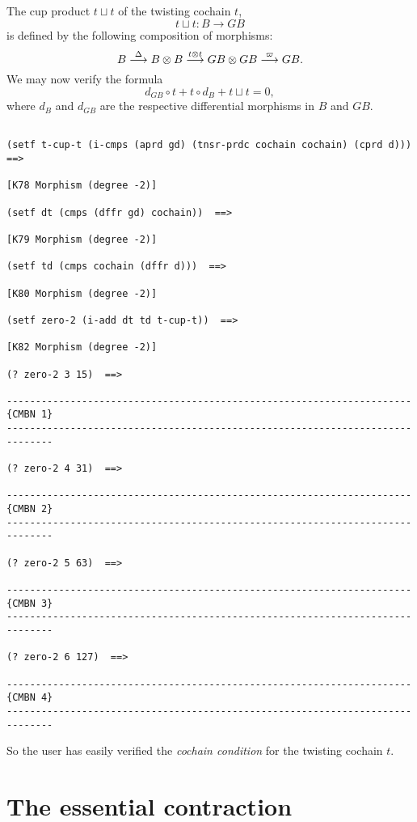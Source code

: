 The cup product $t \sqcup t$ of the twisting cochain $t$,
$$t\sqcup t: B \longrightarrow GB$$
is defined by the following composition of morphisms:
$$B \buildrel {\Delta} \over \longrightarrow B \otimes B
    \buildrel {t \otimes t} \over \longrightarrow GB \otimes GB
    \buildrel {\varpi} \over \longrightarrow GB.$$
We may now verify the formula
$$ d_{GB} \circ t + t \circ d_B + t\sqcup t =0,$$
where $d_B$ and $d_{GB}$ are  the respective differential morphisms in $B$ and $GB$.
{\footnotesize\begin{verbatim}

(setf t-cup-t (i-cmps (aprd gd) (tnsr-prdc cochain cochain) (cprd d)))  ==>

[K78 Morphism (degree -2)]

(setf dt (cmps (dffr gd) cochain))  ==>

[K79 Morphism (degree -2)]

(setf td (cmps cochain (dffr d)))  ==>

[K80 Morphism (degree -2)]

(setf zero-2 (i-add dt td t-cup-t))  ==>

[K82 Morphism (degree -2)]

(? zero-2 3 15)  ==>

----------------------------------------------------------------------{CMBN 1}
------------------------------------------------------------------------------

(? zero-2 4 31)  ==>

----------------------------------------------------------------------{CMBN 2}
------------------------------------------------------------------------------

(? zero-2 5 63)  ==>

----------------------------------------------------------------------{CMBN 3}
------------------------------------------------------------------------------

(? zero-2 6 127)  ==>

----------------------------------------------------------------------{CMBN 4}
------------------------------------------------------------------------------
\end{verbatim}}

So the user has easily verified the {\em cochain condition} for the twisting
cochain $t$.
\newpage

\section {The essential contraction}

